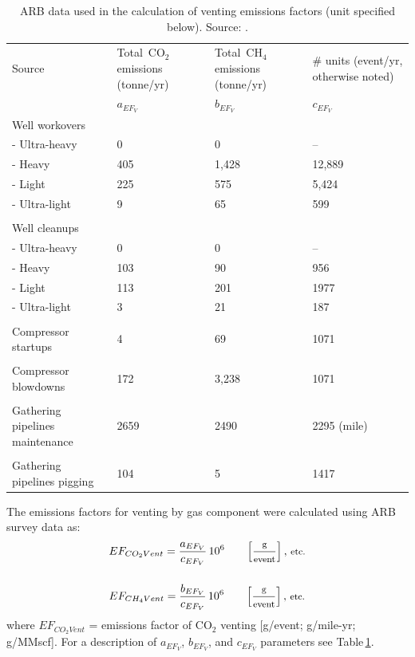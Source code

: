 \documentclass[11pt]{report}
\begin{document}
{{{{\begin{table}
\begin{scriptsize}
\caption{ARB data used in the calculation of venting emissions factors (unit specified below). Source: \cite{Lee2011}.}
\label{tab:ARB_venting_EF}
\begin{threeparttable}
\begin{tabular*}{0.9\columnwidth}{p{}p{}p{}p{}}
\toprule
Source & Total\,\,\,CO$_{2}$ \quad \quad emissions (tonne/yr) & Total\,\,\,CH$_{4}$ \quad\quad\quad emissions \quad\quad\quad (tonne/yr) & \# units (event/yr, otherwise noted) \\
& $a_{EF_V}$ & $b_{EF_V}$ & $c_{EF_V}$\\
\midrule
Well workovers & & & \\
\quad - Ultra-heavy & 0 & 0 & -- \\
\quad - Heavy & 405 & 1,428 & 12,889 \\
\quad - Light & 225 & 575 & 5,424 \\
\quad - Ultra-light & 9 & 65 & 599 \\
\\
Well cleanups & & & \\
\quad - Ultra-heavy & 0 & 0 & -- \\
\quad - Heavy & 103 & 90 & 956 \\
\quad - Light & 113 & 201 & 1977 \\
\quad - Ultra-light & 3 & 21 & 187 \\
\\
Compressor startups & 4 & 69 & 1071 \\
\\
Compressor \quad\quad \quad blowdowns & 172 & 3,238 & 1071 \\
\\
Gathering\,\,pipelines maintenance & 2659 & 2490 & 2295 (mile) \\
\\
Gathering\,\,pipelines pigging & 104 & 5 & 1417 \\
\bottomrule
\end{tabular*}
\end{threeparttable}
\end{scriptsize}
\end{table}

The emissions factors for venting by gas component were calculated using ARB survey data as:
\begin{equation}
\begin{split}
& EF_{CO_{2} Vent} = \frac{a_{EF_V}}{c_{EF_V}}\,10^{6} \quad\quad \footnotesize{\left[\frac{\text{g}}{\text{event}}\right], \, \text{etc.}}\\
\\
& EF_{CH_{4} Vent} = \frac{b_{EF_V}}{c_{EF_V}}\,10^{6} \quad\quad \footnotesize{\left[\frac{\text{g}}{\text{event}}\right], \, \text{etc.}}
\end{split}
\end{equation}
where $ EF_{CO_{2} Vent}$ = emissions factor of CO$_{2}$ venting [g/event; g/mile-yr; g/MMscf]. For a description of $a_{EF_V}$, $b_{EF_V}$, and $c_{EF_V}$ parameters see Table\,\ref{tab:ARB_venting_EF}.

}}}}
\end{document}
